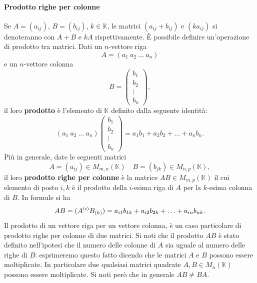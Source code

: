 \documentclass{article}
\theoremstyle{plain}
\theoremstyle{definition}
\theoremstyle{remark}
\begin{document}
\vspace{10pt}

\paragraph{Prodotto righe per colonne}
Se \( A = (a_{ij}) \), \( B = (b_{ij}) \), \( k \in \mathbb{K} \), le matrici \( (a_{ij} + b_{ij}) \) e \( (ka_{ij}) \) si denoteranno con \( A + B \) e \( kA \) rispettivamente.
È possibile definire un'operazione di prodotto tra matrici.
Dati un \( n \)-vettore riga
\[A = (a_1 \ a_2 \ \ldots \ a_n)\]
e un \( n \)-vettore colonna
\[
B = \begin{pmatrix}
b_1 \\
b_2 \\
\vdots \\
b_n
\end{pmatrix},
\]
il loro \textbf{prodotto} è l'elemento di \( \mathbb{K} \) definito dalla seguente identità:
\[
(a_1 \ a_2 \ \ldots \ a_n)
\begin{pmatrix}
b_1 \\
b_2 \\
\vdots \\
b_n
\end{pmatrix}
= a_1b_1 + a_2b_2 + \ldots + a_nb_n.
\]
Più in generale, date le seguenti matrici \[ A = (a_{ij}) \in M_{m,n}(\mathbb{K}) \quad B = (b_{jk}) \in M_{n,p}(\mathbb{K}) ,\] il loro \textbf{prodotto righe per colonne} è la matrice \( AB \in M_{m,p}(\mathbb{K}) \) il cui elemento di posto \( i, k \) è il prodotto della \( i \)-esima riga di \( A \) per la \( k \)-esima colonna di \( B \). 
In formule si ha
\[
AB = (A^{(i)}B_{(k)}) = a_{i1}b_{1k} + a_{i2}b_{2k} + \ldots + a_{in}b_{nk}.\\
\]
Il prodotto di un vettore riga per un vettore colonna, è un caso particolare di prodotto righe per colonne di due matrici.
Si noti che il prodotto \( AB \) è stato definito nell'ipotesi che il numero delle colonne di \( A \) sia uguale al numero delle righe di \( B \): esprimeremo questo fatto dicendo che le matrici \( A \) e \( B \) possono essere moltiplicate.
In particolare due qualsiasi matrici quadrate \( A, B \in M_{n}(\mathbb{K}) \) possono essere moltiplicate. Si noti però che in generale \( AB \neq BA \). 

\vspace{10pt}
\end{document}
